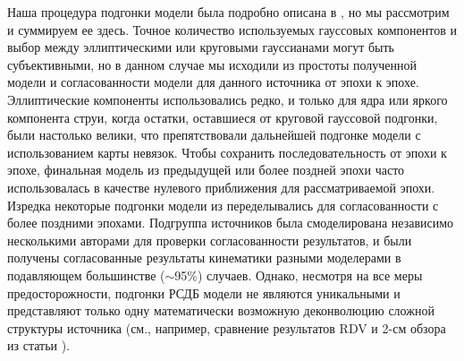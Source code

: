 Наша процедура подгонки модели была подробно описана в \cite{Piner_2007}, но мы рассмотрим и
суммируем ее здесь. Точное количество используемых гауссовых компонентов и выбор между
эллиптическими или круговыми гауссианами могут быть субъективными, но в данном случае мы исходили из
простоты полученной модели и согласованности модели для данного источника от эпохи к эпохе.
Эллиптические компоненты использовались редко, и только для ядра или яркого компонента струи, когда
остатки, оставшиеся от круговой гауссовой подгонки, были настолько велики, что препятствовали
дальнейшей подгонке модели с использованием карты невязок. Чтобы сохранить последовательность от
эпохи к эпохе, финальная модель из предыдущей или более поздней эпохи часто использовалась в
качестве нулевого приближения для рассматриваемой эпохи. Изредка некоторые подгонки модели из
\cite{Piner_2007} переделывались для согласованности с более поздними эпохами. Подгруппа источников
была смоделирована независимо несколькими авторами для проверки согласованности результатов, и были
получены согласованные результаты кинематики разными моделерами в подавляющем большинстве
($\sim$95\%) случаев. Однако, несмотря на все меры предосторожности, подгонки РСДБ модели не
являются уникальными и представляют только одну математически возможную деконволюцию сложной
структуры источника (см., например, сравнение результатов RDV и 2-см обзора из статьи
\cite{Piner_2007}).

